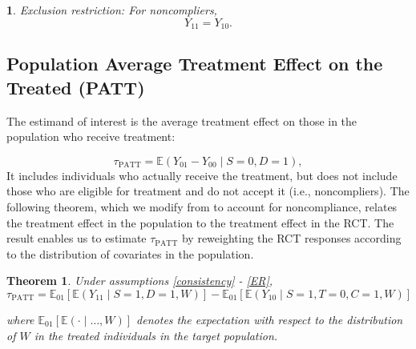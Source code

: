 \documentclass[12pt]{article}
\makeatletter
\newtheorem{theorem}{Theorem}
\newtheorem*{assumption*}{\assumptionnumber}
\providecommand{\assumptionnumber}{}
\newenvironment{assumption}[2]
 {%
  \renewcommand{\assumptionnumber}{Assumption #1}%
  \begin{assumption*}%
  \protected@edef\@currentlabel{#1}%
 }
 {%
  \end{assumption*}
 }
\newcommand{\ex}{\mathbb{E}} %
\makeatother
\begin{document}
\begin{assumption}{7}{}\label{ER}
Exclusion restriction: For noncompliers,
\begin{equation*}
Y_{11} = Y_{10}. 
\end{equation*}  
\end{assumption}


\subsection{Population Average Treatment Effect on the Treated (PATT)}
The estimand of interest is the average treatment effect on those in the population who receive treatment:

\begin{equation}\label{tpatt}
\tau_{\text{PATT}} = \ex\left( Y_{01} - Y_{00} \mid S=0, D=1\right),
\end{equation}
It includes individuals who actually receive the treatment, but does not include those who are eligible for treatment and do not accept it (i.e., noncompliers).  The following theorem, which we modify from \cite{Hartman} to account for noncompliance, relates the treatment effect in the population to the treatment effect in the RCT. The result enables us to estimate $\tau_{\text{PATT}}$ by reweighting the RCT responses according to the distribution of covariates in the population. 

\begin{theorem}\label{thm1}
Under assumptions \eqref{consistency} - \eqref{ER},
\begin{equation}\label{tpatt-est}
\tau_{\text{PATT}} = \ex_{01}\left[  \ex\left(Y_{11} \mid S=1, D=1, W\right)\right]
-\ex_{01}\left[  \ex\left(Y_{10} \mid S=1, T=0, C=1, W\right) \right] 
\end{equation}

where $\ex_{01}\left[\ex(\cdot \mid\dots, W)\right]$ denotes the expectation with respect to the distribution of $W$ in the treated individuals in the target population.  
\end{theorem}
\end{document}
